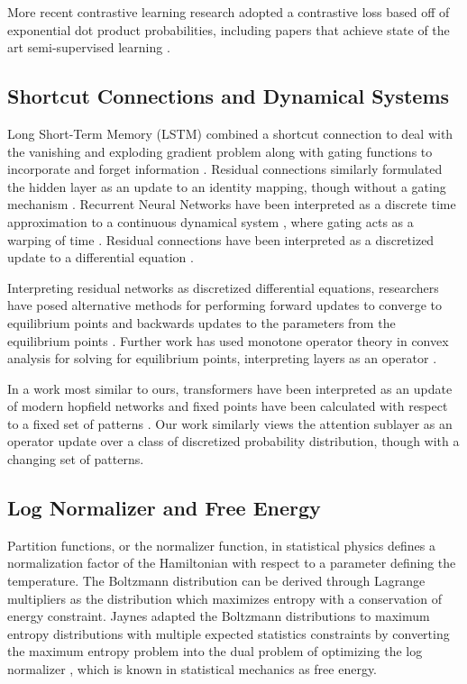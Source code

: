 \documentclass{article}
\begin{document}
More recent contrastive learning research adopted a contrastive loss based off of exponential dot product probabilities, including papers that achieve state of the art semi-supervised learning \cite{wu2018unsupervised,DBLP:journals/corr/abs-2002-05709}.

\subsection{Shortcut Connections and Dynamical Systems}
\label{residual connections}

Long Short-Term Memory (LSTM)  combined a shortcut connection to deal with the vanishing and exploding gradient problem along with gating functions to incorporate and forget information \cite{HochSchm97}. Residual connections similarly formulated the hidden layer as an update to an identity mapping, though without a gating mechanism \cite{he2015deep}. Recurrent Neural Networks have been interpreted as a discrete time approximation to a continuous dynamical system \cite{article}, where gating acts as a warping of time \cite{tallec2018recurrent}. Residual connections have been interpreted as a discretized update to a differential equation \cite{Weinan2017APO,lu2020finite}.

Interpreting residual networks as discretized differential equations, researchers have posed alternative methods for performing forward updates to converge to equilibrium points and backwards updates to the parameters from the equilibrium points \cite{chen2019neural,bai2019deep}. Further work has used monotone operator theory in convex analysis for solving for equilibrium points, interpreting layers as an operator \cite{winston2021monotone}.

In a work most similar to ours, transformers have been interpreted as an update of modern hopfield networks and fixed points have been calculated with respect to a fixed set of patterns \cite{DBLP:journals/corr/abs-2008-02217}.  Our work similarly views the attention sublayer as an operator update over a class of discretized probability distribution, though with a changing set of patterns.

\subsection{Log Normalizer and Free Energy}
\label{log normalizer}

Partition functions, or the normalizer function, in statistical physics defines a normalization factor of the Hamiltonian with respect to a parameter defining the temperature. The Boltzmann distribution can be derived through Lagrange multipliers as the distribution which maximizes entropy with a conservation of energy constraint. Jaynes adapted the Boltzmann distributions to maximum entropy distributions with multiple expected statistics constraints by converting the maximum entropy problem into the dual problem of optimizing the log normalizer \cite{1456693}, which is known in statistical mechanics as free energy.
\end{document}
